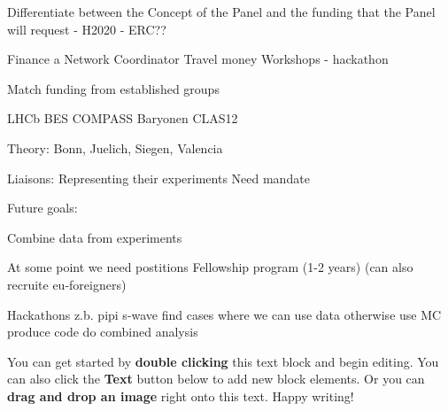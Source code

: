 


Differentiate between the Concept of the Panel
and
the funding that the Panel will request
- H2020
- ERC??

Finance a Network Coordinator
Travel money
Workshops - hackathon

Match funding from established groups

LHCb
BES
COMPASS
Baryonen CLAS12

Theory: Bonn, Juelich, Siegen, Valencia 



Liaisons:
Representing their experiments
Need mandate


Future goals:

Combine data from experiments

At some point we need postitions
Fellowship program (1-2 years) (can also recruite eu-foreigners)

Hackathons
z.b. pipi s-wave
find cases where we can use data
otherwise use MC
produce code
do combined analysis


You can get started by \textbf{double clicking} this text block and begin editing. You can also click the \textbf{Text} button below to add new block elements. Or you can \textbf{drag and drop an image} right onto this text. Happy writing!
